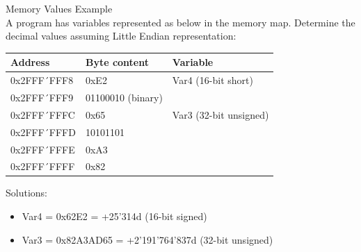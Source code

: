 \begin{example2}{Memory Values Example}\\
A program has variables represented as below in the memory map. Determine the decimal values assuming Little Endian representation:

\begin{tabular}{|l|l|l|}
\hline
Address & Byte content & Variable \\
\hline
0x2FFF´FFF8 & 0xE2 & Var4 (16-bit short) \\
0x2FFF´FFF9 & 01100010 (binary) & \\
\hline
0x2FFF´FFFC & 0x65 & Var3 (32-bit unsigned) \\
0x2FFF´FFFD & 10101101 & \\
0x2FFF´FFFE & 0xA3 & \\
0x2FFF´FFFF & 0x82 & \\
\hline
\end{tabular}

Solutions:
\begin{itemize}
  \item Var4 = 0x62E2 = +25'314d (16-bit signed)
  \item Var3 = 0x82A3AD65 = +2'191'764'837d (32-bit unsigned)
\end{itemize}
\end{example2}




